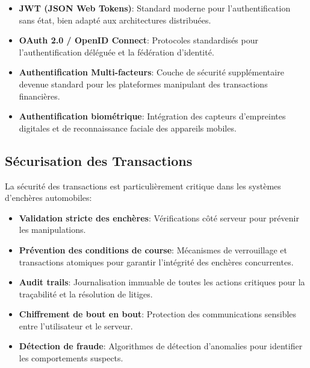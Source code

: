 \begin{itemize}
    \item \textbf{JWT (JSON Web Tokens)}: Standard moderne pour l'authentification sans état, bien adapté aux architectures distribuées.
    
    \item \textbf{OAuth 2.0 / OpenID Connect}: Protocoles standardisés pour l'authentification déléguée et la fédération d'identité.
    
    \item \textbf{Authentification Multi-facteurs}: Couche de sécurité supplémentaire devenue standard pour les plateformes manipulant des transactions financières.
    
    \item \textbf{Authentification biométrique}: Intégration des capteurs d'empreintes digitales et de reconnaissance faciale des appareils mobiles.
\end{itemize}

\subsection{Sécurisation des Transactions}

La sécurité des transactions est particulièrement critique dans les systèmes d'enchères automobiles:

\begin{itemize}
    \item \textbf{Validation stricte des enchères}: Vérifications côté serveur pour prévenir les manipulations.
    
    \item \textbf{Prévention des conditions de course}: Mécanismes de verrouillage et transactions atomiques pour garantir l'intégrité des enchères concurrentes.
    
    \item \textbf{Audit trails}: Journalisation immuable de toutes les actions critiques pour la traçabilité et la résolution de litiges.
    
    \item \textbf{Chiffrement de bout en bout}: Protection des communications sensibles entre l'utilisateur et le serveur.
    
    \item \textbf{Détection de fraude}: Algorithmes de détection d'anomalies pour identifier les comportements suspects.
\end{itemize}


